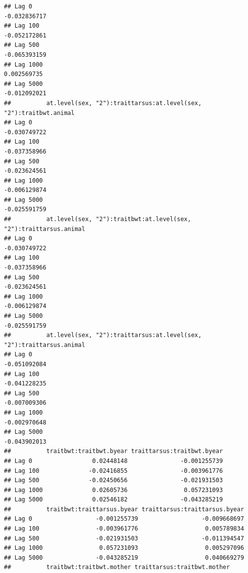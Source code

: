\documentclass[
  12pt,
]{book}
\begin{document}
\begin{verbatim}
## Lag 0                                                      -0.032836717
## Lag 100                                                    -0.052172861
## Lag 500                                                    -0.065393159
## Lag 1000                                                    0.002569735
## Lag 5000                                                   -0.012092021
##          at.level(sex, "2"):traittarsus:at.level(sex, "2"):traitbwt.animal
## Lag 0                                                         -0.030749722
## Lag 100                                                       -0.037358966
## Lag 500                                                       -0.023624561
## Lag 1000                                                      -0.006129874
## Lag 5000                                                      -0.025591759
##          at.level(sex, "2"):traitbwt:at.level(sex, "2"):traittarsus.animal
## Lag 0                                                         -0.030749722
## Lag 100                                                       -0.037358966
## Lag 500                                                       -0.023624561
## Lag 1000                                                      -0.006129874
## Lag 5000                                                      -0.025591759
##          at.level(sex, "2"):traittarsus:at.level(sex, "2"):traittarsus.animal
## Lag 0                                                            -0.051092084
## Lag 100                                                          -0.041228235
## Lag 500                                                          -0.007009306
## Lag 1000                                                         -0.002970648
## Lag 5000                                                         -0.043902013
##          traitbwt:traitbwt.byear traittarsus:traitbwt.byear
## Lag 0                 0.02448148               -0.001255739
## Lag 100              -0.02416855               -0.003961776
## Lag 500              -0.02450656               -0.021931503
## Lag 1000              0.02605736                0.057231093
## Lag 5000              0.02546182               -0.043285219
##          traitbwt:traittarsus.byear traittarsus:traittarsus.byear
## Lag 0                  -0.001255739                  -0.009668697
## Lag 100                -0.003961776                   0.005789834
## Lag 500                -0.021931503                  -0.011394547
## Lag 1000                0.057231093                   0.005297096
## Lag 5000               -0.043285219                   0.040669279
##          traitbwt:traitbwt.mother traittarsus:traitbwt.mother

\end{verbatim}
\end{document}
